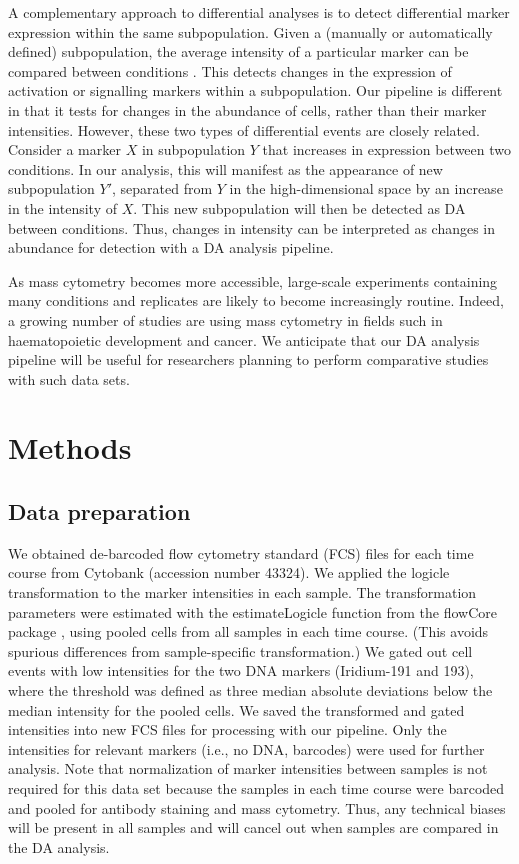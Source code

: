\documentclass{article}
\begin{document}
A complementary approach to differential analyses is to detect differential marker expression within the same subpopulation.
Given a (manually or automatically defined) subpopulation, the average intensity of a particular marker can be compared between conditions \cite{anchang2016visualization,behbehani2015mass}.
This detects changes in the expression of activation or signalling markers within a subpopulation.
Our pipeline is different in that it tests for changes in the abundance of cells, rather than their marker intensities.
However, these two types of differential events are closely related.
Consider a marker $X$ in subpopulation $Y$ that increases in expression between two conditions. 
In our analysis, this will manifest as the appearance of new subpopulation $Y'$, separated from $Y$ in the high-dimensional space by an increase in the intensity of $X$.
This new subpopulation will then be detected as DA between conditions.
Thus, changes in intensity can be interpreted as changes in abundance for detection with a DA analysis pipeline.

As mass cytometry becomes more accessible, large-scale experiments containing many conditions and replicates are likely to become increasingly routine.
Indeed, a growing number of studies are using mass cytometry in fields such in haematopoietic development and cancer.
We anticipate that our DA analysis pipeline will be useful for researchers planning to perform comparative studies with such data sets.


\section{Methods}

\subsection{Data preparation}
We obtained de-barcoded flow cytometry standard (FCS) files for each time course from Cytobank \cite{kotecha2010web} (accession number 43324).
We applied the logicle transformation \cite{parks2006new} to the marker intensities in each sample.
The transformation parameters were estimated with the estimateLogicle function from the flowCore package \cite{hahne2009flowcore}, using pooled cells from all samples in each time course.
(This avoids spurious differences from sample-specific transformation.)
We gated out cell events with low intensities for the two DNA markers (Iridium-191 and 193), where the threshold was defined as three median absolute deviations below the median intensity for the pooled cells.
We saved the transformed and gated intensities into new FCS files for processing with our pipeline.
Only the intensities for relevant markers (i.e., no DNA, barcodes) were used for further analysis.
Note that normalization of marker intensities between samples is not required for this data set because the samples in each time course were barcoded and pooled for antibody staining and mass cytometry.
Thus, any technical biases will be present in all samples and will cancel out when samples are compared in the DA analysis.
\end{document}
